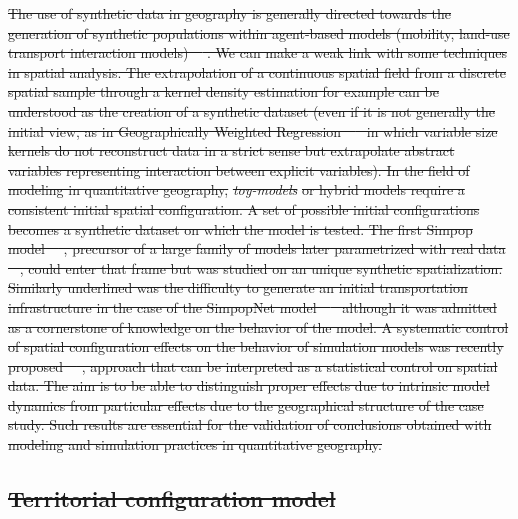 \documentclass{bmcart}
\providecommand{\DIFaddtex}[1]{{\protect\color{blue}\uwave{#1}}} %
\providecommand{\DIFdeltex}[1]{{\protect\color{red}\sout{#1}}}                      %
\providecommand{\DIFaddbegin}{} %
\providecommand{\DIFaddend}{} %
\providecommand{\DIFdelend}{} %
\providecommand{\DIFadd}[1]{\texorpdfstring{\DIFaddtex{#1}}{#1}} %
\providecommand{\DIFdel}[1]{\texorpdfstring{\DIFdeltex{#1}}{}} %
\newcommand{\DIFaddincludegraphics}[2][]{{\color{blue}\fbox{\DIFOincludegraphics[#1]{#2}}}} %
\DeclareRobustCommand{\DIFaddbegin}{\DIFOaddbegin \let\includegraphics\DIFaddincludegraphics} %
\DeclareRobustCommand{\DIFaddend}{\DIFOaddend \let\includegraphics\DIFOincludegraphics} %
\DeclareRobustCommand{\DIFdelend}{\DIFOaddend \let\includegraphics\DIFOincludegraphics} %
\begin{document}
\DIFdel{The use of synthetic data in geography is generally directed towards the generation of synthetic populations within agent-based models (mobility, land-use transport interaction models)~\mbox{%
\cite{pritchard2009advances}}%
. We can make a weak link with some techniques in spatial analysis. The extrapolation of a continuous spatial field from a discrete spatial sample through a kernel density estimation for example can be understood as the creation of a synthetic dataset (even if it is not generally the initial view, as in Geographically Weighted Regression~\mbox{%
\cite{brunsdon1998geographically} }%
in which variable size kernels do not reconstruct data in a strict sense but extrapolate abstract variables representing interaction between explicit variables). In the field of modeling in quantitative geography, }\emph{\DIFdel{toy-models}} %
\DIFdel{or hybrid models require a consistent initial spatial configuration. A set of possible initial configurations becomes a synthetic dataset on which the model is tested. The first Simpop model~\mbox{%
\cite{sanders1997simpop}}%
, precursor of a large family of models later parametrized with real data \mbox{%
\cite{pumain2012multi}}%
, could enter that frame but was studied on an unique synthetic spatialization. Similarly underlined was the difficulty to generate an initial transportation infrastructure in the case of the SimpopNet model~\mbox{%
\cite{schmitt2014modelisation} }%
although it was admitted as a cornerstone of knowledge on the behavior of the model. A systematic control of spatial configuration effects on the behavior of simulation models was recently proposed~\mbox{%
\cite{raimbault2018space}}%
, approach that can be interpreted as a statistical control on spatial data. The aim is to be able to distinguish proper effects due to intrinsic model dynamics from particular effects due to the geographical structure of the case study. Such results are essential for the validation of conclusions obtained with modeling and simulation practices in quantitative geography. }%

\subsection*{\DIFdel{Territorial configuration model}}
\DIFdelend \DIFaddbegin \subsection*{\DIFadd{Contributions}}
\DIFaddend 
\end{document}
